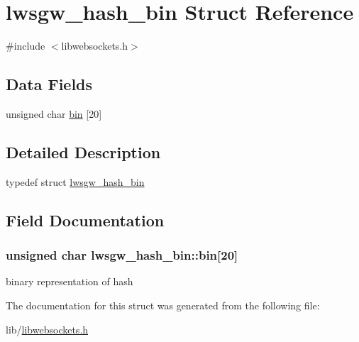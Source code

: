 \hypertarget{structlwsgw__hash__bin}{}\section{lwsgw\+\_\+hash\+\_\+bin Struct Reference}
\label{structlwsgw__hash__bin}


{\ttfamily \#include $<$libwebsockets.\+h$>$}

\subsection*{Data Fields}
\begin{DoxyCompactItemize}
\item 
unsigned char \hyperlink{structlwsgw__hash__bin_ac92f50d9471058525d110597a4e0de6b}{bin} \mbox{[}20\mbox{]}
\end{DoxyCompactItemize}


\subsection{Detailed Description}
typedef struct \hyperlink{structlwsgw__hash__bin}{lwsgw\+\_\+hash\+\_\+bin} 

\subsection{Field Documentation}
\subsubsection[{\texorpdfstring{bin}{bin}}]{\setlength{\rightskip}{0pt plus 5cm}unsigned char lwsgw\+\_\+hash\+\_\+bin\+::bin\mbox{[}20\mbox{]}}\hypertarget{structlwsgw__hash__bin_ac92f50d9471058525d110597a4e0de6b}{}\label{structlwsgw__hash__bin_ac92f50d9471058525d110597a4e0de6b}
binary representation of hash 

The documentation for this struct was generated from the following file\+:\begin{DoxyCompactItemize}
\item 
lib/\hyperlink{libwebsockets_8h}{libwebsockets.\+h}\end{DoxyCompactItemize}
